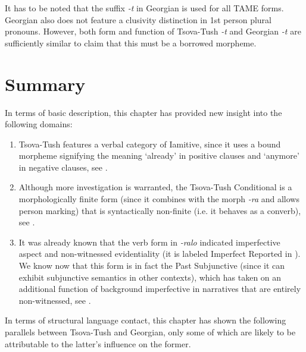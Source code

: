 It has to be noted that the suffix \textit{-t} in Georgian is used for all TAME forms. Georgian also does not feature a clusivity distinction in 1st person plural pronouns. However, both form and function of Tsova-Tush \textit{-t} and Georgian \textit{-t} are sufficiently similar to claim that this must be a borrowed morpheme. 




\section{Summary}

In terms of basic description, this chapter has provided new insight into the following domains:

\begin{enumerate}
	\item Tsova-Tush features a verbal category of Iamitive, since it uses a bound morpheme signifying the meaning `already' in positive clauses and `anymore' in negative clauses, see .
	
	\item Although more investigation is warranted, the Tsova-Tush Conditional is a morphologically finite form (since it combines with the morph \textit{-ra} and allows person marking) that is syntactically non-finite (i.e. it behaves as a converb), see .
	
	\item It was already known that the verb form in \textit{-ralo} indicated imperfective aspect and non-witnessed evidentiality (it is labeled Imperfect Reported in \textcite[180]{holiskygagua}). We know now that this form is in fact the Past Subjunctive (since it can exhibit subjunctive semantics in other contexts), which has taken on an additional function of background imperfective in narratives that are entirely non-witnessed, see .
	
\end{enumerate}


In terms of structural language contact, this chapter has shown the following parallels between Tsova-Tush and Georgian, only some of which are likely to be attributable to the latter's influence on the former. 

